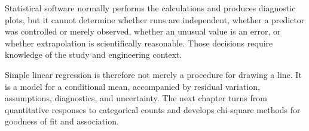 Statistical software normally performs the calculations and produces diagnostic plots, but it cannot determine whether runs are independent, whether a predictor was controlled or merely observed, whether an unusual value is an error, or whether extrapolation is scientifically reasonable. Those decisions require knowledge of the study and engineering context.

Simple linear regression is therefore not merely a procedure for drawing a line. It is a model for a conditional mean, accompanied by residual variation, assumptions, diagnostics, and uncertainty. The next chapter turns from quantitative responses to categorical counts and develops chi-square methods for goodness of fit and association.
